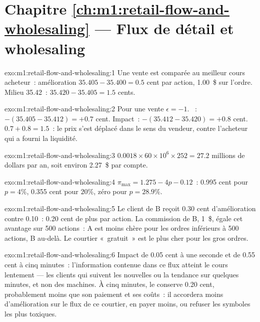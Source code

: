 \section*{Chapitre \ref{ch:m1:retail-flow-and-wholesaling} --- Flux de détail et wholesaling}

\begin{solution}{exo:m1:retail-flow-and-wholesaling:1}
Une vente est comparée au meilleur cours acheteur~: amélioration $35.405 - 35.400 = 0.5$
cent par action, 1.00~\$ sur l'ordre. Milieu 35.42~: 
$35.420 - 35.405 = 1.5$ cents.
\end{solution}

\begin{solution}{exo:m1:retail-flow-and-wholesaling:2}
Pour une vente $\epsilon = -1$. ~: $-(35.405 - 35.412) = +0.7$ cent.
Impact~: $-(35.412 - 35.420) = +0.8$ cent. $0.7 + 0.8 = 1.5$~: le prix s'est déplacé
dans le sens du vendeur, contre l'acheteur qui a fourni la liquidité.
\end{solution}

\begin{solution}{exo:m1:retail-flow-and-wholesaling:3}
$0.0018 \times 60\times10^6 \times 252 = 27.2$ millions de dollars par an, soit environ
2.27~\$ par compte.
\end{solution}

\begin{solution}{exo:m1:retail-flow-and-wholesaling:4}
$\pi_{\max} = 1.275 - 4p - 0.12$~: 0.995 cent pour $p = 4\%$, 0.355 cent pour
$20\%$, zéro pour $p = 28.9\%$.
\end{solution}

\begin{solution}{exo:m1:retail-flow-and-wholesaling:5}
Le client de B reçoit 0.30 cent d'amélioration contre 0.10~: 0.20 cent de plus par
action. La commission de B, 1~\$, égale cet avantage sur 500 actions~: A est
moins chère pour les ordres inférieurs à 500 actions, B au-delà. Le courtier «~gratuit~» est le
plus cher pour les gros ordres.
\end{solution}

\begin{solution}{exo:m1:retail-flow-and-wholesaling:6}
Impact de 0.05 cent à une seconde et de 0.55 cent à cinq minutes~:
l'information contenue dans ce flux atteint le cours lentement --- les clients qui suivent
les nouvelles ou la tendance sur quelques minutes, et non des machines. À cinq minutes, le 
conserve 0.20 cent, probablement moins que son paiement et ses coûts~: il accordera moins
d'amélioration sur le flux de ce courtier, en payer moins, ou refuser les symboles
les plus toxiques.
\end{solution}

